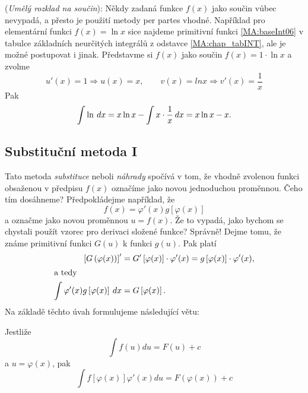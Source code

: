 {      \begin{example}
        (\emph{Umělý rozklad na součin}): Někdy zadaná funkce \(f(x)\) jako součin vůbec nevypadá, 
        a přesto je použití metody per partes vhodné. Například pro elementární funkci \(f(x) = \ln 
        x\) sice najdeme primitivní funkci \ref{MA:baseInt06} v tabulce základních neurčitých 
        integrálů z odstavce \ref{MA:chap_tabINT}, ale je možné postupovat i jinak. Představme si 
        \(f(x)\) jako součin \(f(x) = 1\cdot\ln x\) a zvolme \[u'(x) = 1 ⇒ u(x) = x, \qquad v(x) = 
        lnx ⇒ v'(x) = \frac{1}{x}\] Pak \[\int \ln\hspace{2pt}dx = x\ln x - \int x\cdot\frac{1}{x}\hspace{2pt}dx = x\ln 
        x - x.\]
      \end{example}
  
    \subsection{Substituční metoda I}
      Tato metoda \emph{substituce} neboli \emph{náhrady} spočívá v tom, že vhodně zvolenou funkci 
      obsaženou v předpisu \(f(x)\) označíme jako novou jednoduchou proměnnou. Čeho tím dosáhneme? 
      Předpokládejme například, že \[f(x)=\varphi'(x)g[\varphi(x)]\] a označme jako novou proměnnou 
      \(u = f(x)\). Že to vypadá, jako bychom se chystali použít vzorec pro derivaci složené 
      funkce? Správně! Dejme tomu, že známe primitivní funkci \(G(u)\) k funkci \(g(u)\). Pak platí
      \begin{align*}
       \left[G\left(\varphi(x)\right)\right]' 
          &= G'\left[\varphi(x)\right]\cdot\varphi'(x) =
             g\left[\varphi(x)\right]\cdot\varphi'(x),     \\
          \shortintertext{a tedy}
       \int \varphi'(x) g\left[\varphi(x)\right]\hspace{2pt}dx 
          &=  G\left[\varphi(x)\right]. 
      \end{align*}      
      Na základě těchto úvah formulujeme následující větu:
      \begin{lemma}
        Jestliže
        \begin{equation}\label{ma:eq_subst1}
          \int{f(u)du}=F(u)+c
        \end{equation}
        a $u=\varphi(x)$, pak
        \begin{equation}\label{ma:eq_subst2}
            \int{f[\varphi(x)]\varphi'(x)du}=F(\varphi(x))+c
        \end{equation}
      \end{lemma}
  
}

